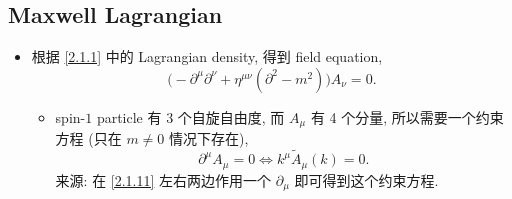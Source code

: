 \subsection{Maxwell Lagrangian} \label{subsection 2.1.2}
\begin{itemize}
	\item 根据 \eqref{2.1.1} 中的 Lagrangian density, 得到 field equation,
	\begin{equation} \label{2.1.11}
		\Big( - \partial^\mu \partial^\nu + \eta^{\mu \nu} (\partial^2 - m^2) \Big) A_\nu = 0.
	\end{equation}
	\begin{itemize}
		\item spin-$1$ particle 有 3 个自旋自由度, 而 $A_\mu$ 有 4 个分量, 所以需要一个约束方程 (只在 $m \neq 0$ 情况下存在),
		\begin{equation} \label{2.1.12}
			\partial^\mu A_\mu = 0 \iff k^\mu \tilde{A}_\mu(k) = 0.
		\end{equation}
		来源: 在 \eqref{2.1.11} 左右两边作用一个 $\partial_\mu$ 即可得到这个约束方程.
	\end{itemize}
\end{itemize}

